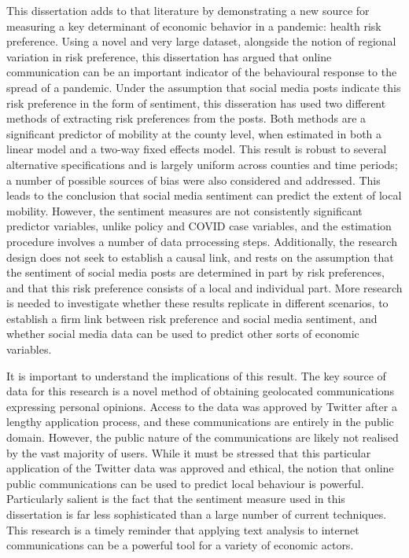 \documentclass{article}
\begin{document}
This dissertation adds to that literature by demonstrating a new source for measuring a key determinant of economic behavior in a pandemic: health risk preference. Using a novel and very large dataset, alongside the notion of regional variation in risk preference, this dissertation has argued that online communication can be an important indicator of the behavioural response to the spread of a pandemic. Under the assumption that social media posts indicate this risk preference in the form of sentiment, this disseration has used two different methods of extracting risk preferences from the posts. Both methods are a significant predictor of mobility at the county level, when estimated in both a linear model and a two-way fixed effects model. This result is robust to several alternative specifications and is largely uniform across counties and time periods; a number of possible sources of bias were also considered and addressed. This leads to the conclusion that social media sentiment can predict the extent of local mobility. However, the sentiment measures are not consistently significant predictor variables, unlike policy and COVID case variables, and the estimation procedure involves a number of data prrocessing steps. Additionally, the research design does not seek to establish a causal link, and rests on the assumption that the sentiment of social media posts are determined in part by risk preferences, and that this risk preference consists of a local and individual part. More research is needed to investigate whether these results replicate in different scenarios, to establish a firm link between risk preference and social media sentiment, and whether social media data can  be used to predict other sorts of economic variables. 

It is important to understand the implications of this result. The key source of data for this research is a novel method of obtaining geolocated communications expressing personal opinions. Access to the data was approved by Twitter after a lengthy application process, and these communications are entirely in the public domain. However, the public nature of the communications are likely not realised by the vast majority of users. While it must be stressed that this particular application of the Twitter data was approved and ethical, the notion that online public communications can be used to predict local behaviour is powerful. Particularly salient is the fact that the sentiment measure used in this dissertation is far less sophisticated than a large number of current techniques. This research is a timely reminder that applying text analysis to internet communications can be a powerful tool for a variety of economic actors.
\end{document}
